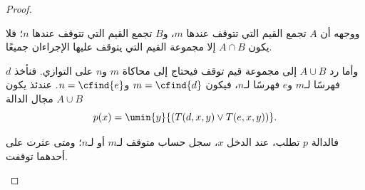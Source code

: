 \documentclass[../../../include/open-logic-section]{subfiles}
\begin{document}
\begin{proof}
\begin{explain}
ووجهه أن $A$ تجمع القيم التي تتوقف عندها $m$،
و$B$ تجمع القيم التي تتوقف عندها $n$؛ فلا يكون $A\cap B$ إلا مجموعة القيم
التي يتوقف عليها الإجراءان جميعًا.
\end{explain}

وأما رد $A\cup B$ إلى مجموعة قيم توقف فيحتاج إلى
محاكاة $m$ و$n$ على التوازي. فنأخذ $d$ فهرسًا لـ$m$ و$e$ فهرسًا
لـ$n$، فيكون $m=\cfind{d}$ و$n=\cfind{e}$. عندئذ يكون $A\cup B$ مجال
الدالة
\[
p(x) = \umin{y}{(T(d,x,y) \lor T(e,x,y))}.
\]
\begin{explain}
فالدالة $p$ تطلب، عند الدخل $x$، سجل حساب متوقف لـ$m$ أو
لـ$n$؛ ومتى عثرت على أحدهما توقفت.
\end{explain}
\end{proof}
\end{document}
